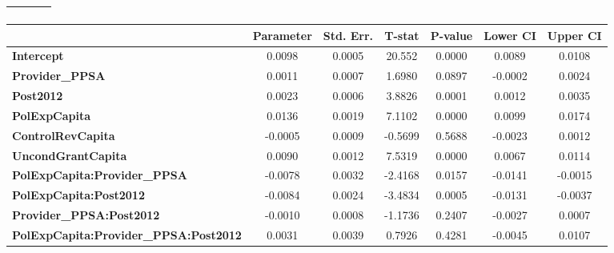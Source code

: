 \begin{center}
\begin{tabular}{lclc}
\textbf{}                                     &                    & \textbf{                     }   &                  \\
\bottomrule
\end{tabular}
\begin{tabular}{lcccccc}
                                              & \textbf{Parameter} & \textbf{Std. Err.} & \textbf{T-stat} & \textbf{P-value} & \textbf{Lower CI} & \textbf{Upper CI}  \\
\midrule
\textbf{Intercept}                            &       0.0098       &       0.0005       &      20.552     &      0.0000      &       0.0089      &       0.0108       \\
\textbf{Provider\_PPSA}                       &       0.0011       &       0.0007       &      1.6980     &      0.0897      &      -0.0002      &       0.0024       \\
\textbf{Post2012}                             &       0.0023       &       0.0006       &      3.8826     &      0.0001      &       0.0012      &       0.0035       \\
\textbf{PolExpCapita}                         &       0.0136       &       0.0019       &      7.1102     &      0.0000      &       0.0099      &       0.0174       \\
\textbf{ControlRevCapita}                     &      -0.0005       &       0.0009       &     -0.5699     &      0.5688      &      -0.0023      &       0.0012       \\
\textbf{UncondGrantCapita}                    &       0.0090       &       0.0012       &      7.5319     &      0.0000      &       0.0067      &       0.0114       \\
\textbf{PolExpCapita:Provider\_PPSA}          &      -0.0078       &       0.0032       &     -2.4168     &      0.0157      &      -0.0141      &      -0.0015       \\
\textbf{PolExpCapita:Post2012}                &      -0.0084       &       0.0024       &     -3.4834     &      0.0005      &      -0.0131      &      -0.0037       \\
\textbf{Provider\_PPSA:Post2012}              &      -0.0010       &       0.0008       &     -1.1736     &      0.2407      &      -0.0027      &       0.0007       \\
\textbf{PolExpCapita:Provider\_PPSA:Post2012} &       0.0031       &       0.0039       &      0.7926     &      0.4281      &      -0.0045      &       0.0107       \\
\bottomrule
\end{tabular}
\end{center}